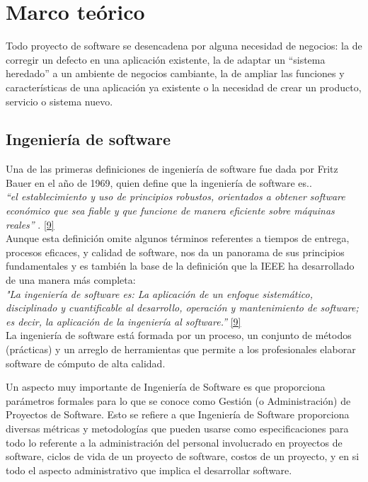 \chapter{Marco teórico} \label{cap:dos}

Todo proyecto de software se desencadena por alguna necesidad de negocios: la de corregir un defecto en una aplicación existente, la de adaptar un “sistema heredado” a un ambiente de negocios cambiante, la de ampliar las funciones y características de una aplicación ya existente o la necesidad de crear un producto, servicio o sistema nuevo.

\section{Ingeniería de software}

Una de las primeras definiciones de ingeniería de software fue dada por Fritz Bauer en el año de 1969, quien define que la ingeniería de software es..\\

	\textit {“el establecimiento y uso de principios robustos, orientados a obtener software económico que sea fiable y que funcione de manera eficiente sobre máquinas reales” }. \hyperlink{b09}{[9]}\\
	
  Aunque esta definición omite algunos términos referentes a tiempos de entrega, procesos eficaces, y calidad de software, nos da un panorama de sus principios fundamentales y es también la base de la definición que la IEEE ha desarrollado de una manera más completa: \\

 \textit {"La ingeniería de software es: La aplicación de un enfoque sistemático, disciplinado y cuantificable al desarrollo, operación y mantenimiento de software; es decir, la aplicación de la ingeniería al software.”}  \hyperlink{b09}{[9]}\\

La ingeniería de software está formada por un proceso, un conjunto de métodos (prácticas) y un arreglo de herramientas que permite a los profesionales elaborar software de cómputo de alta calidad. 

Un aspecto muy importante de Ingeniería de Software es que proporciona parámetros formales para lo que se conoce como Gestión (o Administración) de Proyectos de Software. Esto se refiere a que Ingeniería de Software proporciona diversas métricas y metodologías que pueden usarse como especificaciones para todo lo referente a la administración del personal involucrado en proyectos de software, ciclos de vida de un proyecto de software, costos de un proyecto, y en si todo el aspecto administrativo que
implica el desarrollar software.\\

